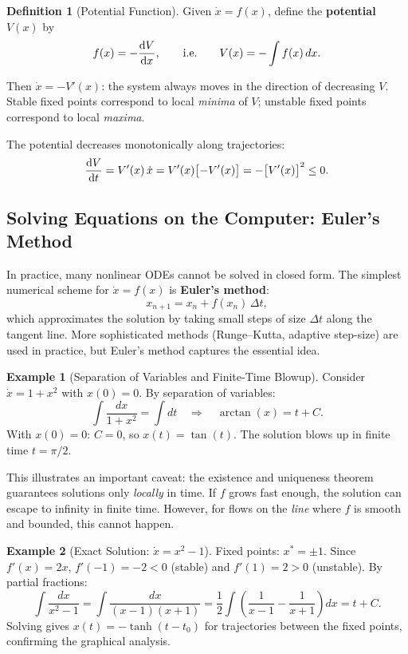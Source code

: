 \documentclass[11pt,letterpaper]{article}
\theoremstyle{definition}
\newtheorem{definition}{Definition}[section]
\newtheorem{example}{Example}[section]
\theoremstyle{plain}
\theoremstyle{remark}
\newcommand{\xdot}{\dot{x}}
\newcommand{\xstar}{x^*}
\begin{document}
\begin{definition}[Potential Function]
Given $\xdot = f(x)$, define the \textbf{potential} $V(x)$ by
\begin{equation}
  f(x) = -\dv{V}{x}, \qquad\text{i.e.}\qquad V(x) = -\int f(x)\,dx.
\end{equation}
\end{definition}

Then $\xdot = -V'(x)$: the system always moves in the direction of
decreasing $V$.  Stable fixed points correspond to local \emph{minima} of
$V$; unstable fixed points correspond to local \emph{maxima}.

The potential decreases monotonically along trajectories:
\[
  \dv{V}{t} = V'(x)\,\xdot = V'(x)\bigl[-V'(x)\bigr]
  = -\bigl[V'(x)\bigr]^2 \le 0.
\]

\subsection{Solving Equations on the Computer: Euler's Method}

In practice, many nonlinear ODEs cannot be solved in closed form.
The simplest numerical scheme for $\xdot = f(x)$ is \textbf{Euler's method}:
\begin{equation}
  x_{n+1} = x_n + f(x_n)\,\Delta t,
\end{equation}
which approximates the solution by taking small steps of size $\Delta t$
along the tangent line.  More sophisticated methods (Runge--Kutta, adaptive
step-size) are used in practice, but Euler's method captures the essential
idea.

\begin{example}[Separation of Variables and Finite-Time Blowup]
Consider $\xdot = 1 + x^2$ with $x(0)=0$.  By separation of variables:
\[
  \int\frac{dx}{1+x^2} = \int dt
  \quad\Longrightarrow\quad \arctan(x) = t + C.
\]
With $x(0)=0$: $C=0$, so $x(t) = \tan(t)$.  The solution blows up in
finite time $t = \pi/2$.

This illustrates an important caveat: the existence and uniqueness theorem
guarantees solutions only \emph{locally} in time.  If $f$ grows fast enough,
the solution can escape to infinity in finite time.  However, for flows on
the \emph{line} where $f$ is smooth and bounded, this cannot happen.
\end{example}

\begin{example}[Exact Solution: $\xdot = x^2 - 1$]
Fixed points: $\xstar = \pm 1$.  Since $f'(x)=2x$, $f'(-1)=-2<0$ (stable)
and $f'(1)=2>0$ (unstable).  By partial fractions:
\[
  \int\frac{dx}{x^2-1} = \int\frac{dx}{(x-1)(x+1)}
  = \frac{1}{2}\int\left(\frac{1}{x-1} - \frac{1}{x+1}\right)dx = t + C.
\]
Solving gives $x(t) = -\tanh(t-t_0)$ for trajectories between the fixed
points, confirming the graphical analysis.
\end{example}
\end{document}
